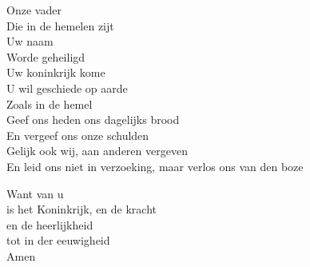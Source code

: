 Onze vader\\
Die in de hemelen zijt\\
Uw naam\\
Worde geheiligd\\

Uw koninkrijk kome\\
U wil geschiede op aarde\\
Zoals in de hemel\\

Geef ons heden ons dagelijks brood\\
En vergeef ons onze schulden\\
Gelijk ook wij, aan anderen vergeven\\

En leid ons niet in verzoeking, maar verlos ons van den boze

Want van u\\
is het Koninkrijk, en de kracht\\
en de heerlijkheid\\
tot in der eeuwigheid\\
Amen